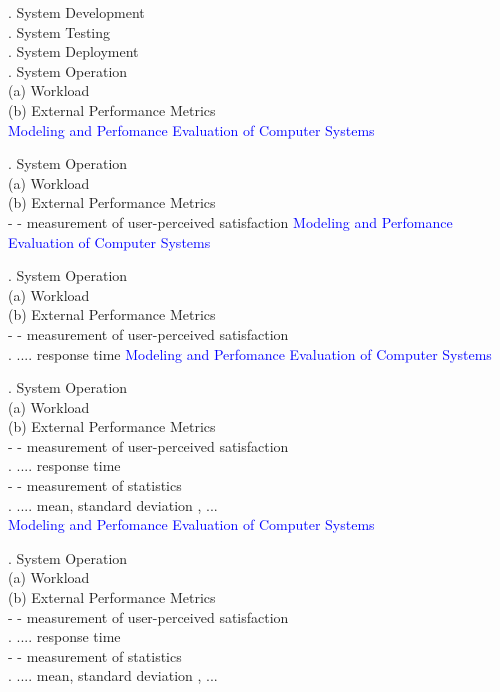 \documentclass[svgnames]{beamer}
\begin{document}
. System Development\\
. System Testing\\
. System Deployment\\
. System Operation\\[8pt] 
(a) Workload\\
(b) External Performance Metrics\\
\newpage
\textcolor{blue}{Modeling and Perfomance Evaluation of Computer Systems} \\[38pt]
\raggedright
{}. System Operation\\[8pt] 
\; (a) Workload\\
\; (b) External Performance Metrics\\
\quad - - measurement of user-perceived satisfaction
\newpage
\textcolor{blue}{Modeling and Perfomance Evaluation of Computer Systems} \\[38pt]
\raggedright
{}. System Operation\\[8pt] 
\; (a) Workload\\
\; (b) External Performance Metrics\\
\quad - - measurement of user-perceived satisfaction\\
\quad . \quad ....  response time
\newpage
\textcolor{blue}{Modeling and Perfomance Evaluation of Computer Systems} \\[38pt]
\raggedright
{}. System Operation\\[8pt] 
\; (a) Workload\\
\; (b) External Performance Metrics\\
\quad - - measurement of user-perceived satisfaction\\
\quad . \quad ....  response time\\
\quad - - measurement of statistics\\
\quad . \quad .... mean, standard deviation , ...\\
\newpage
\textcolor{blue}{Modeling and Perfomance Evaluation of Computer Systems} \\[38pt]
\raggedright
{}. System Operation\\[8pt] 
\; (a) Workload\\
\; (b) External Performance Metrics\\
\quad - - measurement of user-perceived satisfaction\\
\quad . \quad ....  response time\\
\quad - - measurement of statistics\\
\quad . \quad .... mean, standard deviation , ...\\
\end{document}
